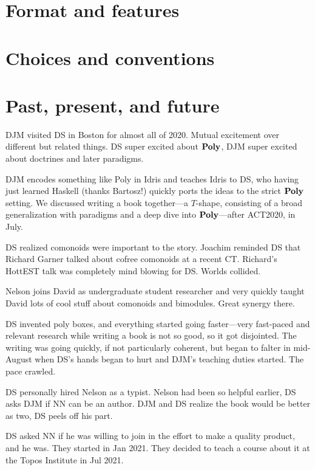\documentclass[Book-Poly]{subfiles}
\begin{document}
\section*{Format and features}

\section*{Choices and conventions}

\section*{Past, present, and future}

DJM visited DS in Boston for almost all of 2020. Mutual excitement over different but related things. DS super excited about $\mathbf{Poly}$, DJM super excited about doctrines and later paradigms.

DJM encodes something like Poly in Idris and teaches Idris to DS, who having just learned Haskell (thanks Bartosz!) quickly ports the ideas to the strict $\mathbf{Poly}$ setting. We discussed writing a book together---a $T$-shape, consisting of a broad generalization with paradigms and a deep dive into $\mathbf{Poly}$---after ACT2020, in July.

DS realized comonoids were important to the story. Joachim reminded DS that Richard Garner talked about cofree comonoids at a recent CT. Richard's HottEST talk was completely mind blowing for DS. Worlds collided.

Nelson joins David as undergraduate student researcher and very quickly taught David lots of cool stuff about comonoids and bimodules. Great synergy there. 

DS invented poly boxes, and everything started going faster---very fast-paced and relevant research while writing a book is not so good, so it got disjointed. The writing was going quickly, if not particularly coherent, but began to falter in mid-August when DS's hands began to hurt and DJM's teaching duties started. The pace crawled. 

DS personally hired Nelson as a typist. Nelson had been so helpful earlier, DS asks DJM if NN can be an author. DJM and DS realize the book would be better as two, DS peels off his part. 

DS asked NN if he was willing to join in the effort to make a quality product, and he was. They started in Jan 2021. They decided to teach a course about it at the Topos Institute in Jul 2021.
\end{document}
